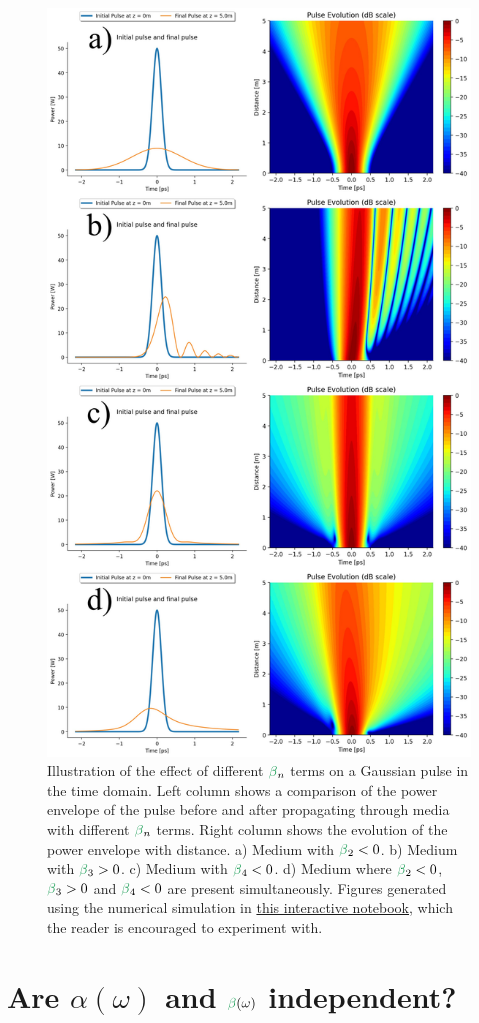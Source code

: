 \begin{figure}
    \centering
    \includegraphics[width=0.75\linewidth]{figures/dispersion_combined.png}
    \caption{Illustration of the effect of different $\betag_n$ terms on a Gaussian pulse in the time domain. Left column shows a comparison of the power envelope of the pulse before and after propagating through media with different $\betag_n$ terms. Right column shows the evolution of the power envelope with distance. a) Medium with $\betag_2<0$. b) Medium with $\betag_3>0$. c) Medium with $\betag_4<0$. d) Medium where $\betag_2<0$,$\betag_3>0$ and $\betag_4<0$ are present simultaneously. 
    Figures generated using the numerical simulation in \href{https://colab.research.google.com/drive/1PW9smFA3PECvcXyWpZcW1ogY4W3hEYFt?usp=sharing}{this interactive notebook}, which the reader is encouraged to experiment with.}
    \label{fig:dispersion_combined}
\end{figure}

\section{Are $\alpha(\omega)$ and $\betag(\omega)$ independent?}
\label{sec:KK_relations}

